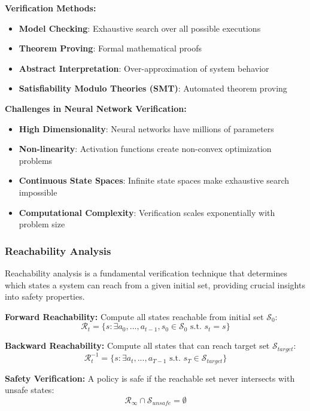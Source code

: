 \documentclass[12pt]{article}
\begin{document}
{{{{\textbf{Verification Methods:}
\begin{itemize}
\item \textbf{Model Checking}: Exhaustive search over all possible executions
\item \textbf{Theorem Proving}: Formal mathematical proofs
\item \textbf{Abstract Interpretation}: Over-approximation of system behavior
\item \textbf{Satisfiability Modulo Theories (SMT)}: Automated theorem proving
\end{itemize}

\textbf{Challenges in Neural Network Verification:}
\begin{itemize}
\item \textbf{High Dimensionality}: Neural networks have millions of parameters
\item \textbf{Non-linearity}: Activation functions create non-convex optimization problems
\item \textbf{Continuous State Spaces}: Infinite state spaces make exhaustive search impossible
\item \textbf{Computational Complexity}: Verification scales exponentially with problem size
\end{itemize}

\subsubsection{Reachability Analysis}

Reachability analysis is a fundamental verification technique that determines which states a system can reach from a given initial set, providing crucial insights into safety properties.

\textbf{Forward Reachability:}
Compute all states reachable from initial set $\mathcal{S}_0$:
\begin{equation}
\mathcal{R}_t = \{s : \exists a_0, ..., a_{t-1}, s_0 \in \mathcal{S}_0 \text{ s.t. } s_t = s\}
\end{equation}

\textbf{Backward Reachability:}
Compute all states that can reach target set $\mathcal{S}_{target}$:
\begin{equation}
\mathcal{R}^{-1}_t = \{s : \exists a_t, ..., a_{T-1} \text{ s.t. } s_T \in \mathcal{S}_{target}\}
\end{equation}

\textbf{Safety Verification:}
A policy is safe if the reachable set never intersects with unsafe states:
\begin{equation}
\mathcal{R}_\infty \cap \mathcal{S}_{unsafe} = \emptyset
\end{equation}

}}}}
\end{document}
